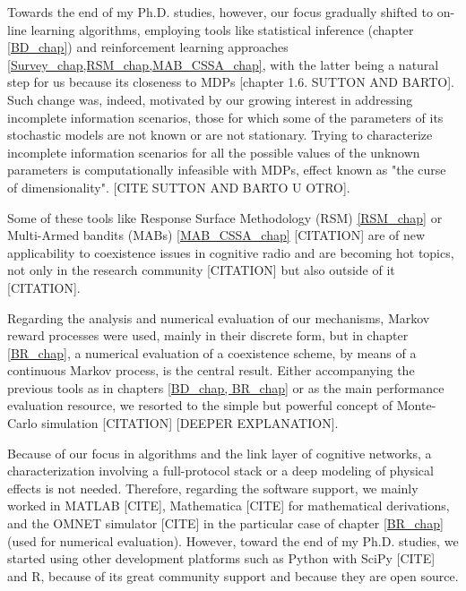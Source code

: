 Towards the end of my Ph.D. studies, however, our focus gradually shifted to on-line learning algorithms, employing tools like statistical inference (chapter \ref{BD_chap}) and reinforcement learning approaches \ref{Survey_chap,RSM_chap,MAB_CSSA_chap}, with the latter being a natural step for us because its closeness to MDPs [chapter 1.6. SUTTON AND BARTO]. Such change was, indeed, motivated by our growing interest in addressing incomplete information scenarios, those for which some of the parameters of its stochastic models are not known or are not stationary. Trying to characterize incomplete information scenarios for all the possible values of the unknown parameters is computationally infeasible with MDPs, effect known as "the curse of dimensionality". [CITE SUTTON AND BARTO U OTRO].

Some of these tools like Response Surface Methodology (RSM) \ref{RSM_chap} or Multi-Armed bandits (MABs) \ref{MAB_CSSA_chap} [CITATION] are of new applicability to coexistence issues in cognitive radio and are becoming hot topics, not only in the research community [CITATION] but also outside of it [CITATION].

Regarding the analysis and numerical evaluation of our mechanisms, Markov reward processes were used, mainly in their discrete form, but in chapter \ref{BR_chap}, a numerical evaluation of a coexistence scheme, by means of a continuous Markov process, is the central result. Either accompanying the previous tools as in chapters \ref{BD_chap, BR_chap} or as the main performance evaluation resource, we resorted to the simple but powerful concept of Monte-Carlo simulation [CITATION] [DEEPER EXPLANATION]. 

Because of our focus in algorithms and the link layer of cognitive networks, a characterization involving a full-protocol stack or a deep modeling of physical effects is not needed. Therefore, regarding the software support, we mainly worked in MATLAB [CITE], Mathematica [CITE] for mathematical derivations, and the OMNET simulator [CITE] in the particular  case of chapter \ref{BR_chap} (used for numerical evaluation). However, toward the end of my Ph.D. studies, we started using other development platforms such as Python with SciPy [CITE] and R, because of its great community support and because they are open source.



